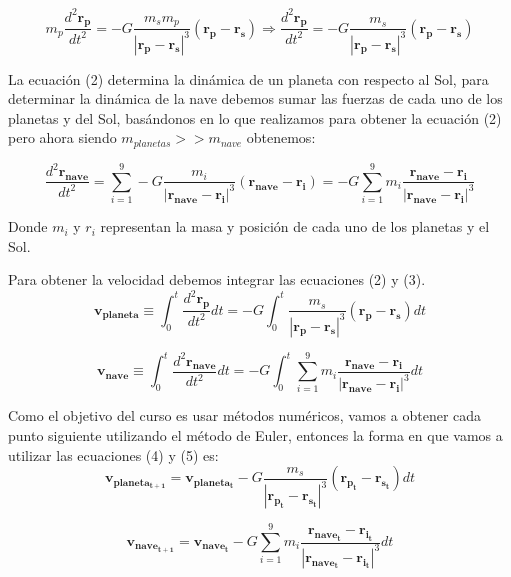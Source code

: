 \documentclass[12pt,letterpaper]{article}
\begin{document}
\begin{equation}
 m_p\dfrac{d ^2 \mathbf{r_p}}{d t^2}=-G\dfrac{m_sm_p}{|\mathbf{r_{p}}-\mathbf{r_s}|^3}(\mathbf{r_{p}}-\mathbf{r_s}) \Rightarrow \dfrac{d ^2 \mathbf{r_p}}{d t^2}=-G\dfrac{m_s}{|\mathbf{r_{p}}-\mathbf{r_s}|^3}(\mathbf{r_{p}}-\mathbf{r_s})
\end{equation} 

La ecuación (2) determina la dinámica de un planeta con respecto al Sol, para determinar la dinámica de la nave debemos sumar las fuerzas de cada uno de los planetas y del Sol, basándonos en lo que realizamos para obtener la ecuación (2) pero ahora siendo $m_{planetas}>>m_{nave}$ obtenemos:

\begin{equation}
\dfrac{d ^2 \mathbf{r_{nave}}}{d t^2}=\sum_{i=1}^{9} -G\dfrac{m_i}{|\mathbf{r_{nave}}-\mathbf{r_i}|^3}(\mathbf{r_{nave}}-\mathbf{r_i})=-G \sum_{i=1}^{9} m_ i\dfrac{\mathbf{r_{nave}}-\mathbf{r_i}}{|\mathbf{r_{nave}}-\mathbf{r_i}|^3}
\end{equation}

Donde $m_i$ y $r_i$ representan la masa y posición de cada uno de los planetas y el Sol.

Para obtener la velocidad debemos integrar las ecuaciones (2) y (3).
\begin{equation}
\mathbf{v_{planeta}}\equiv\int_{0}^{t} \dfrac{d ^2 \mathbf{r_p}}{d t^2} dt=-G \int_{0}^{t} \dfrac{m_s}{|\mathbf{r_{p}}-\mathbf{r_s}|^3}(\mathbf{r_{p}}-\mathbf{r_s}) dt
\end{equation}

\begin{equation}
\mathbf{v_{nave}}\equiv\int_{0}^{t} \dfrac{d ^2 \mathbf{r_{nave}}}{d t^2} dt=-G \int_{0}^{t} \sum_{i=1}^{9} m_ i\dfrac{\mathbf{r_{nave}}-\mathbf{r_i}}{|\mathbf{r_{nave}}-\mathbf{r_i}|^3} dt
\end{equation}

Como el objetivo del curso es usar métodos numéricos, vamos a obtener cada punto siguiente utilizando el método de Euler, entonces la forma en que vamos a utilizar las ecuaciones (4) y (5) es:
\begin{equation}
\mathbf{v_{planeta_{t+1}}}=\mathbf{v_{planeta_t}}-G\dfrac{m_s}{|\mathbf{r_{p_t}}-\mathbf{r_{s_t}}|^3}(\mathbf{r_{p_t}}-\mathbf{r_{s_t}})dt
\end{equation}

\begin{equation}
\mathbf{v_{nave_{t+1}}}=\mathbf{v_{nave_t}}-G \sum_{i=1}^{9} m_ i\dfrac{\mathbf{r_{nave_t}}-\mathbf{r_{i_t}}}{|\mathbf{r_{nave_t}}-\mathbf{r_{i_t}}|^3}dt
\end{equation}
\end{document}
